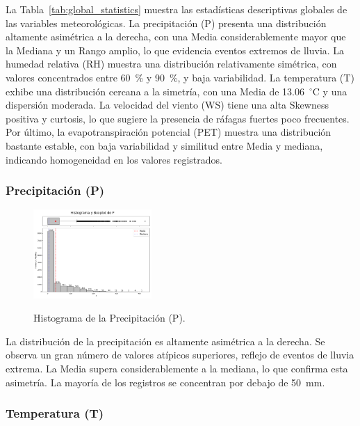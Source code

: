 La Tabla~\ref{tab:global_statistics} muestra las estadísticas descriptivas globales de las variables meteorológicas. La precipitación (P) presenta una distribución altamente asimétrica a la derecha, con una Media considerablemente mayor que la Mediana y un Rango amplio, lo que evidencia eventos extremos de lluvia. La humedad relativa (RH) muestra una distribución relativamente simétrica, con valores concentrados entre 60~\% y 90~\%, y baja variabilidad. La temperatura (T) exhibe una distribución cercana a la simetría, con una Media de 13.06~$^\circ$C y una dispersión moderada. La velocidad del viento (WS) tiene una alta Skewness positiva y curtosis, lo que sugiere la presencia de ráfagas fuertes poco frecuentes. Por último, la evapotranspiración potencial (PET) muestra una distribución bastante estable, con baja variabilidad y similitud entre Media y mediana, indicando homogeneidad en los valores registrados.

\subsubsection*{Precipitación (P)}

\begin{figure}[H]
    \caption{Histograma de la Precipitación (P).}
    \centering
    \includegraphics[width=0.4\textwidth]{resultados/global/univariado/P_histograma.png}
    \label{fig:P_histograma}
\end{figure}

La distribución de la precipitación es altamente asimétrica a la derecha. Se observa un gran número de valores atípicos superiores, reflejo de eventos de lluvia extrema. La Media supera considerablemente a la mediana, lo que confirma esta asimetría. La mayoría de los registros se concentran por debajo de \SI{50}{\milli\meter}.

\vspace{2em}

\subsubsection*{Temperatura (T)}

